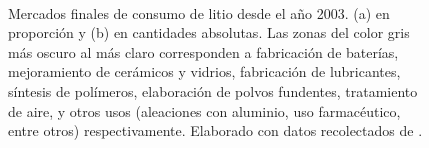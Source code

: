 \begin{figure}[htbp]
    \\%
    \caption[Series de tiempo mercados finales de consumo de litio desde el año 2003.]{Mercados finales de consumo de litio desde el año 2003. (a) en proporción y (b) en cantidades absolutas. Las zonas del color gris más oscuro al más claro corresponden a fabricación de baterías, mejoramiento de cerámicos y vidrios, fabricación de lubricantes, síntesis de polímeros, elaboración de polvos fundentes, tratamiento de aire, y otros usos (aleaciones con aluminio, uso farmacéutico, entre otros) respectivamente.  Elaborado con datos recolectados de \citet{    SQM2003, SQM2004, SQM2005, SQM2006, SQM2007, SQM2008, SQM2009, USGS2011, USGS2012, USGS2013, USGS2014, USGS2015, USGS2016, USGS2017, USGS2018, USGS2019}.}
    \label{fig:uses}
\end{figure}

